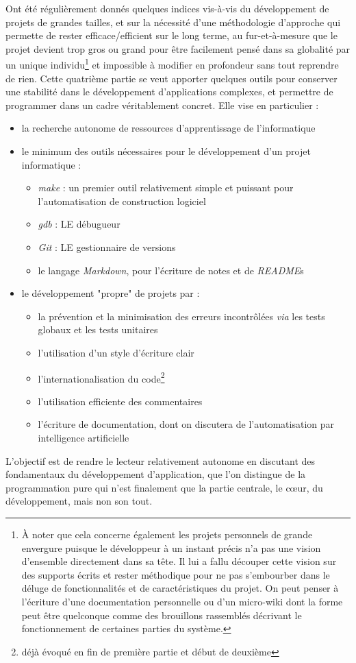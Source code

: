 \documentclass[../../main.tex]{subfiles}
\begin{document}
Ont été régulièrement donnés quelques indices vis-à-vis du développement de projets de grandes tailles, et sur la nécessité d'une méthodologie d'approche qui permette de rester efficace/efficient sur le long terme, au fur-et-à-mesure que le projet devient trop gros ou grand pour être facilement pensé dans sa globalité par un unique individu\footnote{À noter que cela concerne également les projets personnels de grande envergure puisque le développeur à un instant précis n'a pas une vision d'ensemble directement dans sa tête. Il lui a fallu découper cette vision sur des supports écrits et rester méthodique pour ne pas s'embourber dans le déluge de fonctionnalités et de caractéristiques du projet. On peut penser à l'écriture d'une documentation personnelle ou d'un micro-wiki dont la forme peut être quelconque comme des brouillons rassemblés décrivant le fonctionnement de certaines parties du système.} et impossible à modifier en profondeur sans tout reprendre de rien. Cette quatrième partie se veut apporter quelques outils pour conserver une stabilité dans le développement d'applications complexes, et permettre de programmer dans un cadre véritablement concret. Elle vise en particulier :
\begin{itemize}
	\item la recherche autonome de ressources d'apprentissage de l'informatique
	\item le minimum des outils nécessaires pour le développement d'un projet informatique :
		\begin{itemize}
			\item \textit{make} : un premier outil relativement simple et puissant pour l'automatisation de construction logiciel
			\item \textit{gdb} : LE débugueur
			\item \textit{Git} : LE gestionnaire de versions
			\item le langage \textit{Markdown}, pour l'écriture de notes et de \textit{README}s
		\end{itemize}
	\item le développement "propre" de projets par :
	\begin{itemize}
		\item la prévention et la minimisation des erreurs incontrôlées \textit{via} les tests globaux et les tests unitaires
		\item l'utilisation d'un style d'écriture clair
		\item l'internationalisation du code\footnote{déjà évoqué en fin de première partie et début de deuxième}
		\item l'utilisation efficiente des commentaires
		\item l'écriture de documentation, dont on discutera de l'automatisation par intelligence artificielle
	\end{itemize}
\end{itemize}
L'objectif est de rendre le lecteur relativement autonome en discutant des fondamentaux du développement d'application, que l'on distingue de la programmation pure qui n'est finalement que la partie centrale, le c\oe{}ur, du développement, mais non son tout.
\newpage
\end{document}
